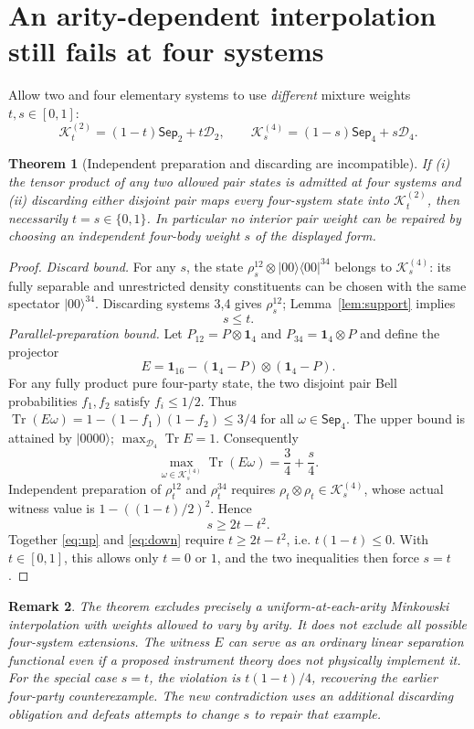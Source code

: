 \documentclass[10pt,letterpaper]{article}
\newtheorem{theorem}{Theorem}
\newtheorem{remark}[theorem]{Remark}
\newcommand{\DD}{\mathcal D}
\newcommand{\SSep}{\mathsf{Sep}}
\newcommand{\KK}{\mathcal K}
\newcommand{\tr}{\operatorname{Tr}}
\newcommand{\id}{\mathbf 1}
\begin{document}
\section{An arity-dependent interpolation still fails at four systems}
Allow two and four elementary systems to use \emph{different} mixture weights
$t,s\in[0,1]$:
\[
\KK_t^{(2)}=(1-t)\SSep_2+t\DD_2,\qquad
\KK_s^{(4)}=(1-s)\SSep_4+s\DD_4.
\]
\begin{theorem}[Independent preparation and discarding are incompatible]
\label{thm:arity}
If (i) the tensor product of any two allowed pair states is admitted at four
systems and (ii) discarding either disjoint pair maps every four-system
state into $\KK_t^{(2)}$, then necessarily $t=s\in\{0,1\}$.
In particular no interior pair weight can be repaired by choosing an
independent four-body weight $s$ of the displayed form.
\end{theorem}
\begin{proof}
\emph{Discard bound.} For any $s$, the state
$\rho_s^{12}\otimes|00\rangle\langle00|^{34}$ belongs to $\KK_s^{(4)}$:
its fully separable and unrestricted density constituents can be chosen
with the same spectator $|00\rangle^{34}$. Discarding systems 3,4 gives
$\rho_s^{12}$; Lemma~\ref{lem:support} implies
\begin{equation}\label{eq:up}s\le t.\end{equation}
\emph{Parallel-preparation bound.} Let $P_{12}=P\otimes\id_4$ and
$P_{34}=\id_4\otimes P$ and define the projector
\[
E=\id_{16}-(\id_4-P)\otimes(\id_4-P).
\]
For any fully product pure four-party state, the two disjoint pair Bell
probabilities $f_1,f_2$ satisfy $f_i\le1/2$. Thus
$\tr(E\omega)=1-(1-f_1)(1-f_2)\le3/4$ for all
$\omega\in\SSep_4$. The upper bound is attained by $|0000\rangle$;
$\max_{\DD_4}\tr E=1$. Consequently
\[
\max_{\omega\in\KK_s^{(4)}}\tr(E\omega)=\frac34+\frac s4.
\]
Independent preparation of $\rho_t^{12}$ and $\rho_t^{34}$ requires
$\rho_t\otimes\rho_t\in\KK_s^{(4)}$, whose actual witness value is
$1-((1-t)/2)^2$. Hence
\begin{equation}\label{eq:down}
s\ge2t-t^2.
\end{equation}
Together \eqref{eq:up} and \eqref{eq:down} require
$t\ge2t-t^2$, i.e. $t(1-t)\le0$. With $t\in[0,1]$, this allows only
$t=0$ or $1$, and the two inequalities then force $s=t$.
\end{proof}
\begin{remark}
The theorem excludes precisely a \emph{uniform-at-each-arity
Minkowski interpolation} with weights allowed to vary by arity. It does
not exclude all possible four-system extensions. The witness $E$ can
serve as an ordinary linear separation functional even if a proposed
instrument theory does not physically implement it. For the special case
$s=t$, the violation is $t(1-t)/4$, recovering the earlier four-party
counterexample. The new contradiction uses an additional \emph{discarding}
obligation and defeats attempts to change $s$ to repair that example.
\end{remark}
\end{document}
